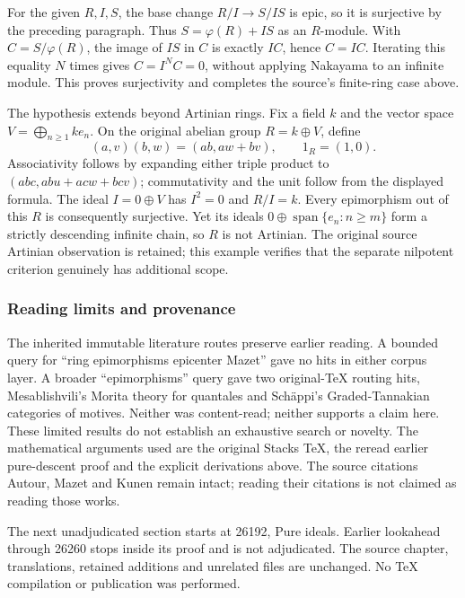 For the given \(R,I,S\), the base change \(R/I\to S/IS\) is epic, so it is surjective by the preceding paragraph. Thus \(S=\varphi(R)+IS\) as an \(R\)-module. With \(C=S/\varphi(R)\), the image of \(IS\) in \(C\) is exactly \(IC\), hence \(C=IC\). Iterating this equality \(N\) times gives \(C=I^NC=0\), without applying Nakayama to an infinite module. This proves surjectivity and completes the source's finite-ring case above.

The hypothesis extends beyond Artinian rings. Fix a field \(k\) and the vector space \(V=\bigoplus_{n\ge1} k e_n\). On the original abelian group \(R=k\oplus V\), define \[
(a,v)(b,w)=(ab,aw+bv),\qquad 1_R=(1,0).
\] Associativity follows by expanding either triple product to \((abc,ab u+ac w+bc v)\); commutativity and the unit follow from the displayed formula. The ideal \(I=0\oplus V\) has \(I^2=0\) and \(R/I=k\). Every epimorphism out of this \(R\) is consequently surjective. Yet its ideals \(0\oplus\operatorname{span}\{e_n:n\ge m\}\) form a strictly descending infinite chain, so \(R\) is not Artinian. The original source Artinian observation is retained; this example verifies that the separate nilpotent criterion genuinely has additional scope.

\subsubsection{Reading limits and provenance}\label{reading-limits-and-provenance}

The inherited immutable literature routes preserve earlier reading. A bounded query for ``ring epimorphisms epicenter Mazet'' gave no hits in either corpus layer. A broader ``epimorphisms'' query gave two original-TeX routing hits, Mesablishvili's Morita theory for quantales and Schäppi's Graded-Tannakian categories of motives. Neither was content-read; neither supports a claim here. These limited results do not establish an exhaustive search or novelty. The mathematical arguments used are the original Stacks TeX, the reread earlier pure-descent proof and the explicit derivations above. The source citations Autour, Mazet and Kunen remain intact; reading their citations is not claimed as reading those works.

The next unadjudicated section starts at 26192, Pure ideals. Earlier lookahead through 26260 stops inside its proof and is not adjudicated. The source chapter, translations, retained additions and unrelated files are unchanged. No TeX compilation or publication was performed.
